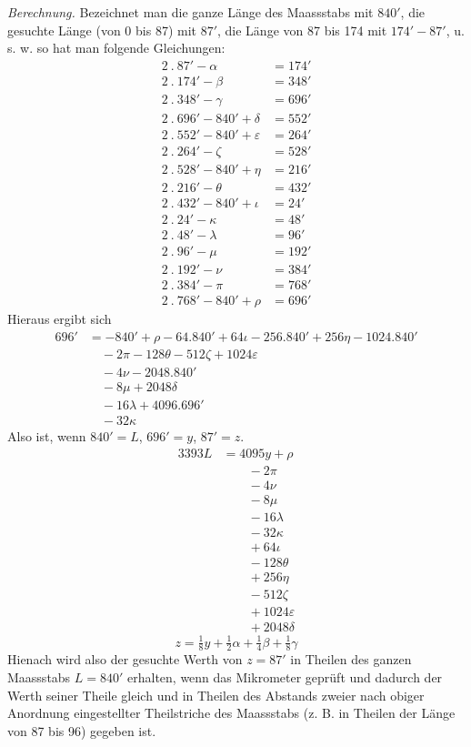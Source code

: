 \textit{Berechnung.} Bezeichnet man die ganze Länge des Maassstabs mit $840'$, die gesuchte Länge (von 0 bis 87) mit $87'$, die Länge von 87 bis 174 mit $174'-87'$, u. s. w. so hat man folgende Gleichungen:
\[
\begin{aligned}
2\ .\ 87'-\alpha&=174'\\
2\ .\ 174'-\beta&=348'\\
2\ .\ 348'-\gamma&=696'\\
2\ .\ 696'-840'+\delta&=552'\\
2\ .\ 552'-840'+\varepsilon&=264'\\
2\ .\ 264'-\zeta&=528'\\
2\ .\ 528'-840'+\eta&=216'\\
2\ .\ 216'-\theta&=432'\\
2\ .\ 432'-840'+\iota&=24'\\
2\ .\ 24'-\kappa&=48'\\
2\ .\ 48'-\lambda&=96'\\
2\ .\ 96'-\mu&=192'\\
2\ .\ 192'-\nu&=384'\\
2\ .\ 384'-\pi&=768'\\
2\ .\ 768'-840'+\rho&=696'
\end{aligned}
\]
Hieraus ergibt sich
\[
\begin{aligned}
696'&=-840'+\rho-64.840'+64\iota-256.840'+256\eta-1024.840'\\
&\quad-2\pi-128\theta-512\zeta+1024\varepsilon\\
&\quad-4\nu-2048.840'\\
&\quad-8\mu+2048\delta\\
&\quad-16\lambda+4096.696'\\
&\quad-32\kappa
\end{aligned}
\]
Also ist, wenn $840'=L$, $696'=y$, $87'=z$.
\[
\begin{aligned}
3393L&=4095y+\rho\\
&\qquad-2\pi\\
&\qquad-4\nu\\
&\qquad-8\mu\\
&\qquad-16\lambda\\
&\qquad-32\kappa\\
&\qquad+64\iota\\
&\qquad-128\theta\\
&\qquad+256\eta\\
&\qquad-512\zeta\\
&\qquad+1024\varepsilon\\
&\qquad+2048\delta
\end{aligned}
\]
\[
z=\tfrac18y+\tfrac12\alpha+\tfrac14\beta+\tfrac18\gamma
\]
Hienach wird also der gesuchte Werth von $z=87'$ in Theilen des ganzen Maassstabs $L=840'$ erhalten, wenn das Mikrometer geprüft und dadurch der Werth seiner Theile gleich und in Theilen des Abstands zweier nach obiger Anordnung eingestellter Theilstriche des Maassstabs (z. B. in Theilen der Länge von 87 bis 96) gegeben ist.

